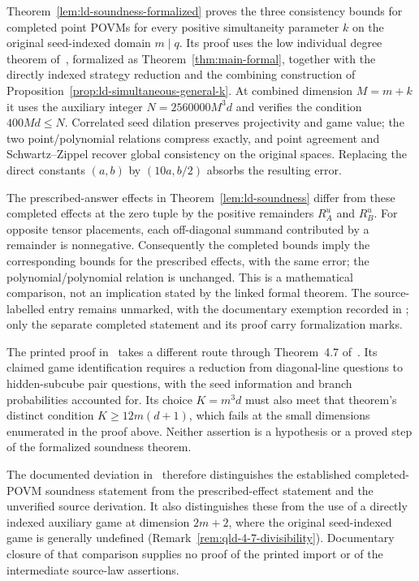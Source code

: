 \begin{remark}\label{rem:ld-soundness-provider}
	Theorem~\ref{lem:ld-soundness-formalized} proves the three consistency
	bounds for completed point POVMs for every positive simultaneity
	parameter $k$ on the original seed-indexed domain $m\mid q$. Its proof
	uses the low individual degree theorem of~\cite{Ji2020LowIndividualDegree},
	formalized as Theorem~\ref{thm:main-formal}, together with the directly
	indexed strategy reduction and the combining construction of
	Proposition~\ref{prop:ld-simultaneous-general-k}. At combined dimension
	$M=m+k$ it uses the auxiliary integer $N=2560000M^3d$ and verifies the
	condition $400Md\le N$. Correlated seed dilation preserves projectivity
	and game value; the two point/polynomial relations compress exactly,
	and point agreement and Schwartz--Zippel recover global consistency on
	the original spaces. Replacing the direct constants $(a,b)$ by
	$(10a,b/2)$ absorbs the resulting error.

	The prescribed-answer effects in Theorem~\ref{lem:ld-soundness}
	differ from these completed effects at the zero tuple by the positive
	remainders $R_A^u$ and $R_B^u$. For opposite tensor placements, each
	off-diagonal summand contributed by a remainder is nonnegative.
	Consequently the completed bounds imply the corresponding bounds for
	the prescribed effects, with the same error; the polynomial/polynomial
	relation is unchanged. This is a mathematical comparison, not an
	implication stated by the linked formal theorem. The source-labelled
	entry remains unmarked, with the documentary exemption recorded in
	\cite{gap:qpbt_ld-dimension-divisibility}; only the separate completed
	statement and its proof carry formalization marks.

	The printed proof in~\cite{Ji2020MIPStar} takes a different route through
	Theorem~4.7 of~\cite{Ji2021Quantum}. Its claimed game identification
	requires a reduction from diagonal-line questions to hidden-subcube
	pair questions, with the seed information and branch probabilities
	accounted for. Its choice $K=m^3d$ must also meet that theorem's distinct
	condition $K\ge12m(d+1)$, which fails at the small dimensions enumerated
	in the proof above. Neither assertion is a hypothesis or a proved step
	of the formalized soundness theorem.

	The documented deviation in~\cite{gap:qpbt_ld-dimension-divisibility}
	therefore distinguishes the established completed-POVM soundness statement
	from the prescribed-effect statement and the unverified source derivation.
	It also distinguishes these from the
	use of a directly indexed auxiliary game at dimension $2m+2$, where
	the original seed-indexed game is generally undefined
	(Remark~\ref{rem:qld-4-7-divisibility}). Documentary closure of that
	comparison supplies no proof of the printed import or of the
	intermediate source-law assertions.
\end{remark}

